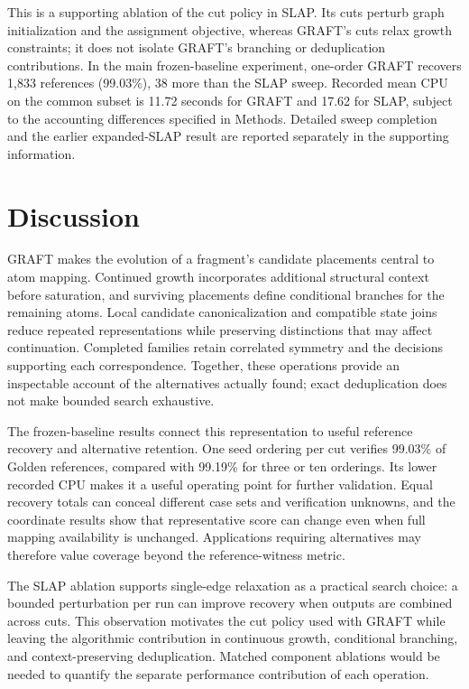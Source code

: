 This is a supporting ablation of the cut policy in SLAP. Its cuts perturb graph initialization and the assignment objective, whereas GRAFT's cuts relax growth constraints; it does not isolate GRAFT's branching or deduplication contributions. In the main frozen-baseline experiment, one-order GRAFT recovers 1,833 references (99.03\%), 38 more than the SLAP sweep. Recorded mean CPU on the common subset is 11.72 seconds for GRAFT and 17.62 for SLAP, subject to the accounting differences specified in Methods. Detailed sweep completion and the earlier expanded-SLAP result are reported separately in the supporting information.

\FloatBarrier
\section{Discussion}

GRAFT makes the evolution of a fragment's candidate placements central to atom mapping. Continued growth incorporates additional structural context before saturation, and surviving placements define conditional branches for the remaining atoms. Local candidate canonicalization and compatible state joins reduce repeated representations while preserving distinctions that may affect continuation. Completed families retain correlated symmetry and the decisions supporting each correspondence. Together, these operations provide an inspectable account of the alternatives actually found; exact deduplication does not make bounded search exhaustive.

The frozen-baseline results connect this representation to useful reference recovery and alternative retention. One seed ordering per cut verifies 99.03\% of Golden references, compared with 99.19\% for three or ten orderings. Its lower recorded CPU makes it a useful operating point for further validation. Equal recovery totals can conceal different case sets and verification unknowns, and the coordinate results show that representative score can change even when full mapping availability is unchanged. Applications requiring alternatives may therefore value coverage beyond the reference-witness metric.

The SLAP ablation supports single-edge relaxation as a practical search choice: a bounded perturbation per run can improve recovery when outputs are combined across cuts. This observation motivates the cut policy used with GRAFT while leaving the algorithmic contribution in continuous growth, conditional branching, and context-preserving deduplication. Matched component ablations would be needed to quantify the separate performance contribution of each operation.

